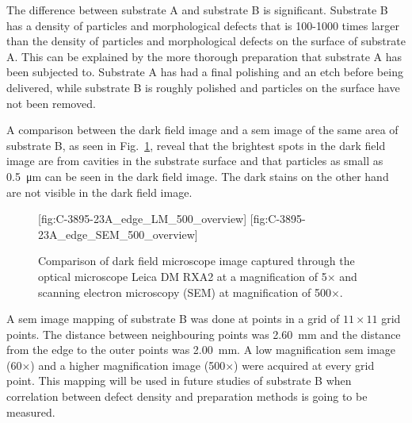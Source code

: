 The difference between substrate A and substrate B is significant. Substrate B has a density of particles and morphological defects that is 100-1000 times larger than the density of particles and morphological defects on the surface of substrate A. This can be explained by the more thorough preparation that substrate A has been subjected to. Substrate A has had a final polishing and an etch before being delivered, while substrate B is roughly polished and particles on the surface have not been removed.

A comparison between the dark field image and a \ac{sem} image of the same area of substrate B, as seen in Fig.~\ref{fig:LM_SEM_C3895}, reveal that the brightest spots in the dark field image are from cavities in the substrate surface and that particles as small as \SI{0.5}{\micro\metre} can be seen in the dark field image. The dark stains on the other hand are not visible in the dark field image.

\begin{figure}[htbp]
    \centering
    [fig:C-3895-23A_edge_LM_500_overview]
    [fig:C-3895-23A_edge_SEM_500_overview]
    \caption[Comparison of dark field microscopy and SEM.]{Comparison of dark field microscope image captured through the optical microscope Leica DM RXA2 at a magnification of 5$\times$ and scanning electron microscopy (SEM) at magnification of 500$\times$.}
    \label{fig:LM_SEM_C3895}
\end{figure}

A \ac{sem} image mapping of substrate B was done at points in a grid of $11\times11$ grid points. The distance between neighbouring points was \SI{2.60}{\milli\metre} and the distance from the edge to the outer points was \SI{2.00}{\milli\metre}. A low magnification \ac{sem} image (60$\times$) and a higher magnification image (500$\times$) were acquired at every grid point. This mapping will be used in future studies of substrate B when correlation between defect density and preparation methods is going to be measured.

